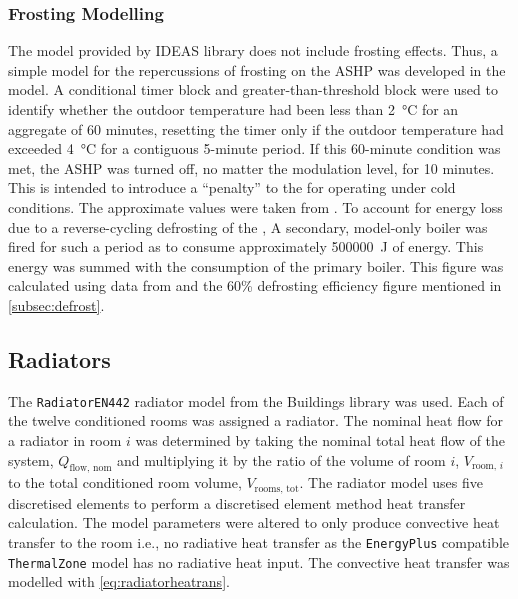 \subsubsection{Frosting Modelling} \label{subsubsec:frostingmod}
The model provided by IDEAS library does not include frosting effects. Thus, a simple model for the repercussions of frosting on the \ac{ASHP} was developed in the \modelica model. A conditional timer block and greater-than-threshold block were used to identify whether the outdoor temperature had been less than \qty{2}{\celsius} for an aggregate of 60 minutes, resetting the timer only if the outdoor temperature had exceeded \qty{4}{\celsius} for a contiguous 5-minute period. If this 60-minute condition was met, the \ac{ASHP} was turned off, no matter the modulation level, for 10 minutes. This is intended to introduce a ``penalty'' to the \HP for operating under cold conditions. The approximate values were taken from \citeauthor{sandstrom_frosting_2021} \cite{sandstrom_frosting_2021}. To account for energy loss due to a reverse-cycling defrosting of the \HP, A secondary, model-only boiler was fired for such a period as to consume approximately \qty{500000}{\joule} of energy. This energy was summed with the consumption of the primary boiler. This figure was calculated using data from \citeauthor{sandstrom_frosting_2021} \cite{sandstrom_frosting_2021} and the 60\% defrosting efficiency figure mentioned in \cref{subsec:defrost}. 

\subsection{Radiators} \label{subsec:rad}
The \texttt{RadiatorEN442} radiator model from the Buildings library \cite{wetter_modelica_2014} was used. Each of the twelve conditioned rooms was assigned a radiator. The nominal heat flow for a radiator in room $i$ was determined by taking the nominal total heat flow of the system, $Q_\text{flow, nom}$ and multiplying it by the ratio of the volume of room $i$, $V_{\text{room, }i}$ to the total conditioned room volume, $V_\text{rooms, tot}$. The radiator model uses five discretised elements to perform a discretised element method heat transfer calculation. The model parameters were altered to only produce convective heat transfer to the room i.e., no radiative heat transfer as the \texttt{EnergyPlus} compatible \texttt{ThermalZone} model has no radiative heat input. The convective heat transfer was modelled with \cref{eq:radiatorheatrans}.


